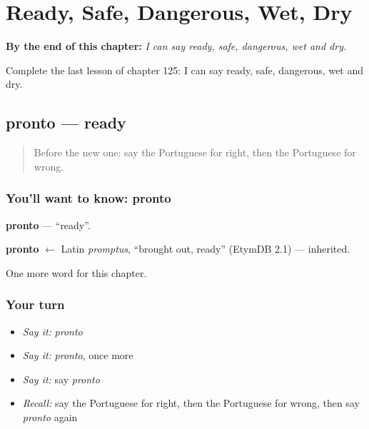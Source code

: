 
\chapter{Ready, Safe, Dangerous, Wet, Dry}
\label{ch:pt-ready-safe-dangerous-wet-dry}

\begin{chapteropening}
\textbf{By the end of this chapter:} \emph{I can say ready, safe, dangerous, wet and dry.}

Complete the last lesson of chapter 125: I can say ready, safe, dangerous, wet and dry.
\end{chapteropening}

\section[pronto]{pronto — ready}

\label{lesson:PT-C125-pronto}



\begin{quote}
Before the new one: say the Portuguese for right, then the Portuguese for wrong.
\end{quote}

\subsection*{You'll want to know: pronto}
\textbf{pronto} — \textquotedblleft{}ready\textquotedblright{}.

\begin{cousinweb}
\textbf{pronto} $\leftarrow$ Latin \emph{promptus}, \textquotedblleft{}brought out, ready\textquotedblright{} (EtymDB 2.1) — inherited.
\end{cousinweb}

\begin{grammarlens}[title={What you've built}]
One more word for this chapter.
\end{grammarlens}

\subsection*{Your turn}
\begin{itemize}
\raggedright
  \item \emph{Say it:} \emph{pronto}
  \item \emph{Say it:} \emph{pronto}, once more
  \item \emph{Say it:} say \emph{pronto}
  \item \emph{Recall:} say the Portuguese for right, then the Portuguese for wrong, then say \emph{pronto} again
\end{itemize}

